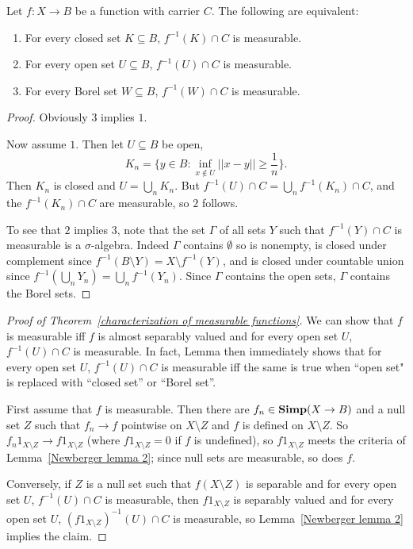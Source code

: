\begin{lemma}
\label{Newberger lemma 3}
Let $f: X \to B$ be a function with carrier $C$. The following are equivalent:
\begin{enumerate}
\item For every closed set $K \subseteq B$, $f^{-1}(K) \cap C$ is measurable.
\item For every open set $U \subseteq B$, $f^{-1}(U) \cap C$ is measurable.
\item For every Borel set $W \subseteq B$, $f^{-1}(W) \cap C$ is measurable.
\end{enumerate}
\end{lemma}
\begin{proof}
Obviously $3$ implies $1$.

Now assume $1$. Then let $U \subseteq B$ be open,
\[K_{n} = \{y \in B: \inf_{x \notin U} ||x - y|| \geq \frac{1}{n}\}.\]
Then $K_{n}$ is closed and $U = \bigcup_{n} K_{n}$. But $f^{-1}(U) \cap C = \bigcup_{n} f^{-1}(K_{n}) \cap C$, and the $f^{-1}(K_{n}) \cap C$ are measurable, so $2$ follows.

To see that $2$ implies $3$, note that the set $\Gamma$ of all sets $Y$ such that $f^{-1}(Y) \cap C$ is measurable is a $\sigma$-algebra.
Indeed $\Gamma$ contains $\emptyset$ so is nonempty, is closed under complement since $f^{-1}(B \setminus Y) = X \setminus f^{-1}(Y)$, and is closed under countable union since $f^{-1}(\bigcup_{n} Y_{n}) = \bigcup_{n} f^{-1}(Y_{n})$.
Since $\Gamma$ contains the open sets, $\Gamma$ contains the Borel sets.
\end{proof}

\begin{proof}[Proof of Theorem~\ref{characterization of measurable functions}]
We can show that $f$ is measurable iff $f$ is almost separably valued and for every open set $U$, $f^{-1}(U) \cap C$ is measurable.
In fact, Lemma \label{Newberger lemma 3} then immediately shows that for every open set $U$, $f^{-1}(U) \cap C$ is measurable iff the same is true when ``open set" is replaced with ``closed set'' or ``Borel set''.

First assume that $f$ is measurable. Then there are $f_{n} \in \mathbf{Simp}(X \to B)$ and a null set $Z$ such that $f_{n} \to f$ pointwise on $X \setminus Z$ and $f$ is defined on $X \setminus Z$.
So $f_{n}1_{X \setminus Z} \to f1_{X \setminus Z}$ (where $f1_{X \setminus Z} = 0$ if $f$ is undefined), so $f1_{X \setminus Z}$ meets the criteria of Lemma~\ref{Newberger lemma 2}; since null sets are measurable, so does $f$.

Conversely, if $Z$ is a null set such that $f(X \setminus Z)$ is separable and for every open set $U$, $f^{-1}(U) \cap C$ is measurable, then $f1_{X \setminus Z}$ is separably valued and for every open set $U$, $(f1_{X \setminus Z})^{-1}(U) \cap C$ is measurable, so Lemma~\ref{Newberger lemma 2} implies the claim.
\end{proof}

